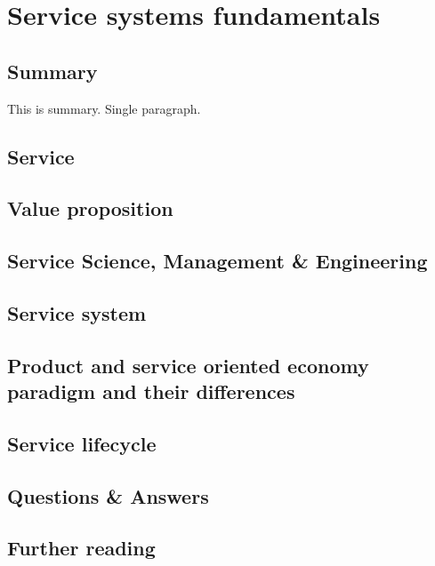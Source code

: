 \section{Service systems fundamentals}

\subsection{Summary}
This is summary. Single paragraph.

\subsection{Service}

\subsection{Value proposition}

\subsection{Service Science, Management \& Engineering}

\subsection{Service system}

\subsection{Product and service oriented economy paradigm and their differences}

\subsection{Service lifecycle}

\subsection{Questions \& Answers}

\subsection{Further reading}

